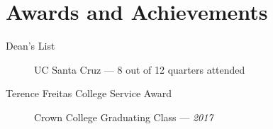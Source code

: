 \documentclass[10pt]{article}
\begin{document}
\section*{Awards and Achievements}
\begin{description}
  \item[Dean's List] UC Santa Cruz --- 8 out of 12 quarters attended
  \item[Terence Freitas College Service Award] Crown College Graduating Class --- \textit{2017}
\end{description}
\end{document}
